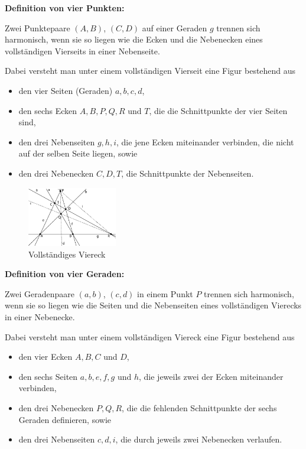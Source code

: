 \documentclass[12pt,a4paper]{article}
\begin{document}
\textbf{Definition von vier Punkten:}

Zwei Punktepaare $(A,B)$, $(C,D)$ auf einer Geraden $g$ \glqq trennen sich harmonisch\grqq , wenn sie so liegen wie die Ecken und die Nebenecken eines vollständigen Vierseits in einer Nebenseite.

Dabei versteht man unter einem vollständigen Vierseit eine Figur bestehend aus

\begin{itemize}
\item den vier Seiten (Geraden) $a, b, c, d$,
\item den sechs Ecken $A, B, P, Q, R$ und $T$, die die Schnittpunkte der vier Seiten sind,
\item den drei Nebenseiten $g, h, i$, die jene Ecken miteinander verbinden, die nicht auf der selben Seite liegen, sowie
\item den drei Nebenecken $C, D, T$, die Schnittpunkte der Nebenseiten.
\end{itemize}

\begin{figure}
\centering
\includegraphics[width=0.35\textwidth]{Bilder/vollstaendigesViereck.png}
\caption{Vollständiges Viereck}
\end{figure}

\textbf{Definition von vier Geraden:}

Zwei Geradenpaare $(a,b)$, $(c,d)$ in einem Punkt $P$ \glqq trennen sich harmonisch\grqq , wenn sie so liegen wie die Seiten und die Nebenseiten eines vollständigen Vierecks in einer Nebenecke.

Dabei versteht man unter einem vollständigen Viereck eine Figur bestehend aus


\begin{itemize}
\item den vier Ecken $A, B, C$ und $D$,
\item den sechs Seiten $a, b, e, f, g$ und $h$, die jeweils zwei der Ecken miteinander verbinden,
\item den drei Nebenecken $P, Q, R$, die die fehlenden Schnittpunkte der sechs Geraden definieren, sowie
\item den drei Nebenseiten $c, d, i$, die durch jeweils zwei Nebenecken verlaufen.
\end{itemize}
\end{document}
